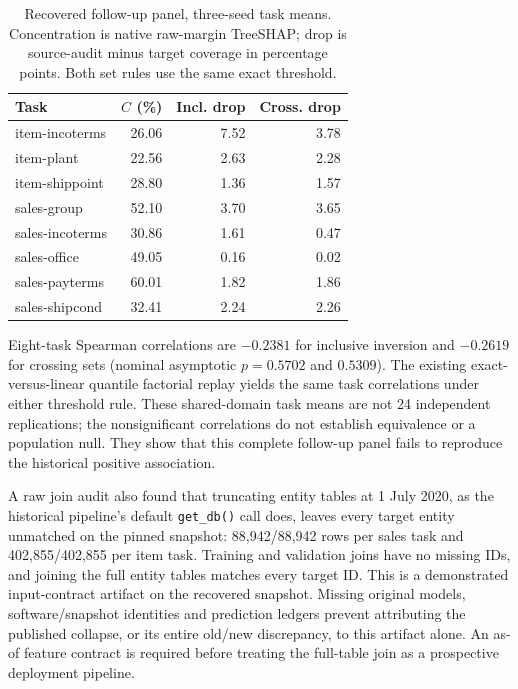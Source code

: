 \documentclass[accepted]{uai2026} %
\begin{document}
\begin{table}[htbp]
\centering
\caption{Recovered follow-up panel, three-seed task means. Concentration is native raw-margin TreeSHAP; drop is source-audit minus target coverage in percentage points. Both set rules use the same exact threshold.}\label{tab:recovered}
\small
\begin{tabular}{@{}lrrr@{}}
\toprule
Task & $C$ (\%) & Incl. drop & Cross. drop \\
\midrule
item-incoterms & 26.06 & 7.52 & 3.78 \\
item-plant & 22.56 & 2.63 & 2.28 \\
item-shippoint & 28.80 & 1.36 & 1.57 \\
sales-group & 52.10 & 3.70 & 3.65 \\
sales-incoterms & 30.86 & 1.61 & 0.47 \\
sales-office & 49.05 & 0.16 & 0.02 \\
sales-payterms & 60.01 & 1.82 & 1.86 \\
sales-shipcond & 32.41 & 2.24 & 2.26 \\
\bottomrule
\end{tabular}
\end{table}

Eight-task Spearman correlations are $-0.2381$ for inclusive inversion and $-0.2619$ for crossing sets (nominal asymptotic $p=0.5702$ and $0.5309$). The existing exact-versus-linear quantile factorial replay yields the same task correlations under either threshold rule. These shared-domain task means are not 24 independent replications; the nonsignificant correlations do not establish equivalence or a population null. They show that this complete follow-up panel fails to reproduce the historical positive association.

A raw join audit also found that truncating entity tables at 1 July 2020, as the historical pipeline's default \texttt{get\_db()} call does, leaves every target entity unmatched on the pinned snapshot: 88,942/88,942 rows per sales task and 402,855/402,855 per item task. Training and validation joins have no missing IDs, and joining the full entity tables matches every target ID. This is a demonstrated input-contract artifact on the recovered snapshot. Missing original models, software/snapshot identities and prediction ledgers prevent attributing the published collapse, or its entire old/new discrepancy, to this artifact alone. An as-of feature contract is required before treating the full-table join as a prospective deployment pipeline.
\end{document}
